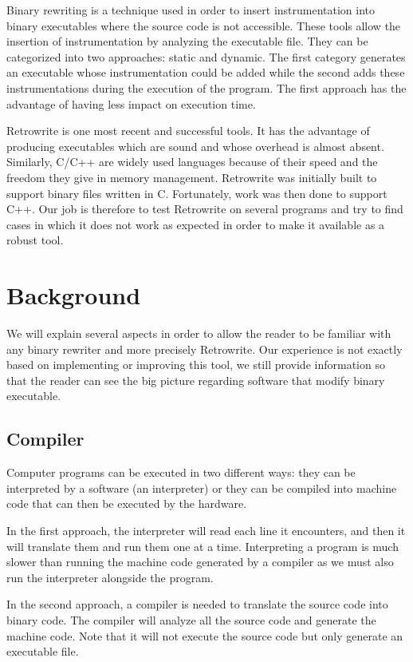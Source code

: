 \documentclass[a4paper,11pt,oneside]{report}
\newcommand{\sysname}{Retrowrite\xspace}
\begin{document}
Binary rewriting is a technique used in order to insert instrumentation into
binary executables where the source code is not accessible. These tools allow
the insertion of instrumentation by analyzing the executable file. They can be
categorized into two approaches: static and dynamic. The first category
generates an executable whose instrumentation could be added while the second
adds these instrumentations during the execution of the program. The first
approach has the advantage of having less impact on execution time.

Retrowrite is one most recent and successful tools. It has the advantage of
producing executables which are sound and whose overhead is almost absent.
Similarly, C/C++ are widely used languages because of their speed and the
freedom they give in memory management. Retrowrite was initially built to
support binary files written in C. Fortunately, work was then done to support
C++. Our job is therefore to test Retrowrite on several programs and try to
find cases in which it does not work as expected in order to make it available
as a robust tool.

\chapter{Background}
We will explain several aspects in order to allow the reader to be familiar
with any binary rewriter and more precisely \sysname. Our experience is not
exactly based on implementing or improving this tool, we still provide information
so that the reader can see the big picture regarding software that modify binary
executable.

\section{Compiler}
Computer programs can be executed in two different ways: they can be interpreted
by a software (an interpreter) or they can be compiled into machine code that can
then be executed by the hardware. 


In the first approach, the interpreter will read each line it encounters, and
then it will translate them and run them one at a time. Interpreting a program
is much slower than running the machine code generated by a compiler as we must
also run the interpreter alongside the program.

In the second approach, a compiler is needed to translate the source code into
binary code.
The compiler will analyze all the source code and generate the machine code.
Note that it will not execute the source code but only generate an executable
file.
\end{document}
